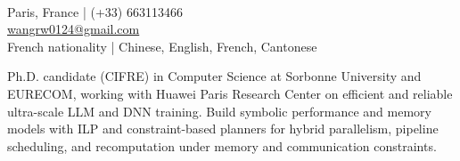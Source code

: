 \documentclass[a4paper,9pt]{article}
\begin{document}
\begin{minipage}[t]{0.56\textwidth}
  \\[1pt]
\end{minipage}
\hfill
\begin{minipage}[t]{0.41\textwidth}
  \raggedleft
  {\footnotesize\color{TextMuted}
  Paris, France \quad | \quad (+33) 663113466 \\
  \href{mailto:wangrw0124@gmail.com}{wangrw0124@gmail.com} \\
  French nationality \quad | \quad Chinese, English, French, Cantonese}
\end{minipage}

\vspace{4pt}
\TopRule
\vspace{4pt}

{\footnotesize
Ph.D. candidate (CIFRE) in Computer Science at Sorbonne University and EURECOM, working with Huawei Paris Research Center on efficient and reliable ultra-scale LLM and DNN training. Build symbolic performance and memory models with ILP and constraint-based planners for hybrid parallelism, pipeline scheduling, and recomputation under memory and communication constraints.}

\vspace{3pt}

\vspace{2pt}
\end{document}

